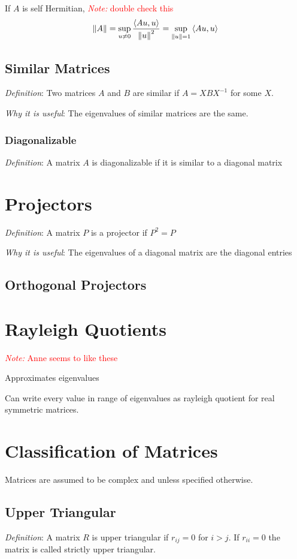 \documentclass[12pt]{article}
\newcommand{\note}[1]{\textcolor{red}{\textit{Note:} #1}}
\begin{document}
If \( A \) is self Hermitian,
\note{double check this}
\begin{align*}
    \left\lVert A\right\rVert = \sup_{u\neq 0} \frac{\left\langle Au,u \right\rangle}{\left\lVert u\right\rVert^2} = \sup_{\left\lVert u\right\rVert=1} \left\langle Au,u \right\rangle
\end{align*}


\subsection{Similar Matrices}
\textit{Definition}: Two matrices \( A \) and \( B \) are similar if \( A = XBX^{-1} \) for some \( X \).

\textit{Why it is useful}: The eigenvalues of similar matrices are the same.

\subsubsection{Diagonalizable}
\textit{Definition}: A matrix \( A \) is diagonalizable if it is similar to a diagonal matrix

\pagebreak
\section{Projectors}
\textit{Definition}: A matrix \( P \) is a projector if \( P^2 = P \)

\textit{Why it is useful}: The eigenvalues of a diagonal matrix are the diagonal entries


\subsection{Orthogonal Projectors}


\pagebreak
\section{Rayleigh Quotients}
\note{Anne seems to like these}

Approximates eigenvalues

Can write every value in range of eigenvalues as rayleigh quotient for real symmetric matrices.


\pagebreak
\section{Classification of Matrices}
Matrices are assumed to be complex and unless specified otherwise.

\subsection{Upper Triangular}
\textit{Definition}: A matrix \( R \) is upper triangular if \( r_{ij} = 0 \) for \( i>j \).
If \( r_{ii} = 0 \) the matrix is called strictly upper triangular. 
\end{document}
